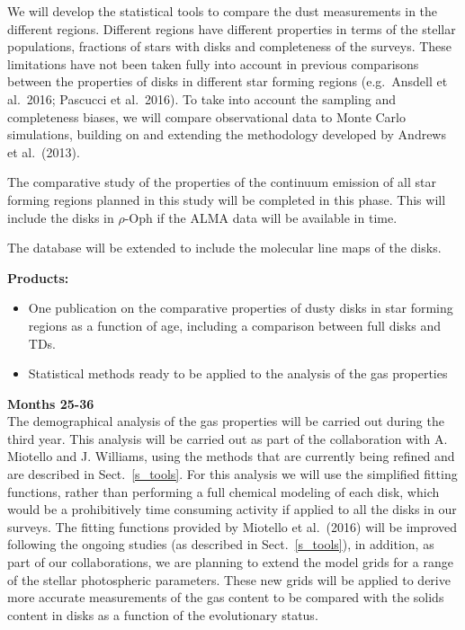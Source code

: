 \documentclass[10pt,fleqn,twoside]{article}
\begin{document}
We will develop the statistical tools to compare the dust measurements in the different regions.
Different regions have different properties in terms of the stellar populations, fractions of stars with disks and completeness of the surveys. These limitations have not been taken fully into account in previous 
comparisons between the properties of disks in different star forming regions (e.g.\ Ansdell et al.~2016; Pascucci et al.~2016). To take into account the sampling and completeness biases, we will compare observational data to Monte Carlo simulations, building on and extending the methodology developed by Andrews et al.~(2013).

The comparative study of the properties of the continuum emission of all star forming regions planned in this study will be completed in this phase. This will include the disks in $\rho$-Oph if the ALMA data will be available in time. 

The database will be extended to include the molecular line maps of the disks.
 
\smallskip
{\bf Products:} 
\begin{itemize}
\item One publication on the comparative properties of dusty disks in star forming regions as a function of age, including a comparison between full disks and TDs.
\item Statistical methods ready to be applied to the analysis of the gas properties
\end{itemize}

{\Tcol\bf Months 25-36}\\

The demographical analysis of the gas properties will be carried out during the third year. This analysis will be carried out as part of the collaboration with A. Miotello and J. Williams, using the methods that are currently being refined and are described in Sect.~\ref{s_tools}. For this analysis we will use the simplified fitting functions, rather than performing a full chemical modeling of each disk, which would be a prohibitively time consuming activity if applied to all the disks in our surveys. The fitting functions provided by Miotello et al.~(2016) will be improved following the ongoing studies (as described in Sect.~\ref{s_tools}), in addition, as part of our collaborations, we are planning to extend the model grids for a range of the stellar photospheric parameters. These new grids will be applied to derive more accurate measurements of the gas content to be compared with the solids content in disks as a function of the evolutionary status. 
\end{document}
